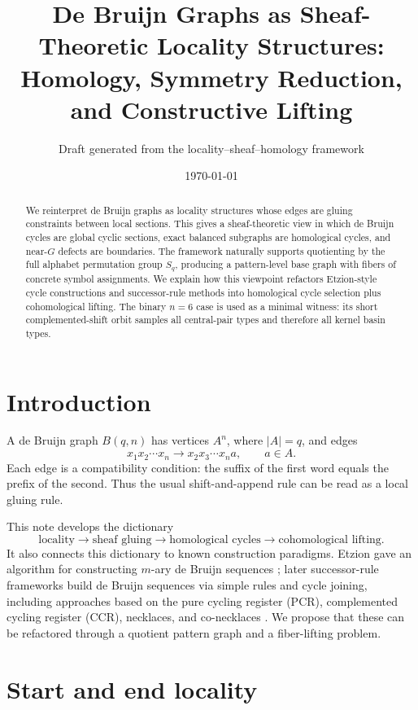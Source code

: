 \documentclass[11pt]{article}
\title{De Bruijn Graphs as Sheaf-Theoretic Locality Structures:\\
Homology, Symmetry Reduction, and Constructive Lifting}
\author{Draft generated from the locality--sheaf--homology framework}
\date{\today}
\begin{document}
\maketitle

\begin{abstract}
We reinterpret de Bruijn graphs as locality structures whose edges are gluing constraints between local sections. This gives a sheaf-theoretic view in which de Bruijn cycles are global cyclic sections, exact balanced subgraphs are homological cycles, and near-\(G\) defects are boundaries. The framework naturally supports quotienting by the full alphabet permutation group \(S_q\), producing a pattern-level base graph with fibers of concrete symbol assignments. We explain how this viewpoint refactors Etzion-style cycle constructions and successor-rule methods into homological cycle selection plus cohomological lifting. The binary \(n=6\) case is used as a minimal witness: its short complemented-shift orbit samples all central-pair types and therefore all kernel basin types.
\end{abstract}

\section{Introduction}

A de Bruijn graph \(B(q,n)\) has vertices \(A^n\), where \(|A|=q\), and edges
\[
x_1x_2\cdots x_n \to x_2x_3\cdots x_n a,\qquad a\in A.
\]
Each edge is a compatibility condition: the suffix of the first word equals the prefix of the second. Thus the usual shift-and-append rule can be read as a local gluing rule.

This note develops the dictionary
\[
\text{locality}\to\text{sheaf gluing}\to\text{homological cycles}\to\text{cohomological lifting}.
\]
It also connects this dictionary to known construction paradigms. Etzion gave an algorithm for constructing \(m\)-ary de Bruijn sequences \cite{etzion1986}; later successor-rule frameworks build de Bruijn sequences via simple rules and cycle joining, including approaches based on the pure cycling register (PCR), complemented cycling register (CCR), necklaces, and co-necklaces \cite{gabric2018framework,gabric2016ccr}. We propose that these can be refactored through a quotient pattern graph and a fiber-lifting problem.

\section{Start and end locality}
\end{document}
